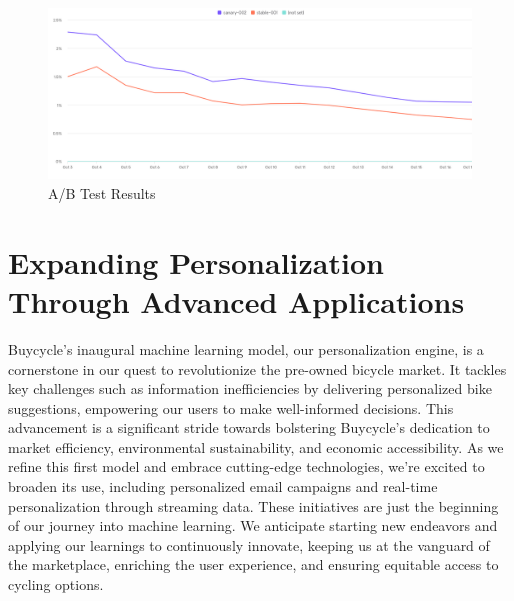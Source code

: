 \documentclass{article}
\begin{document}
\begin{figure}[h]
\centering
\includegraphics[width=1\textwidth]{ab_test_recom.png}
\caption{A/B Test Results}
\end{figure}



\section*{Expanding Personalization Through Advanced Applications}

Buycycle's inaugural machine learning model, our personalization engine, is a cornerstone in our quest to revolutionize the pre-owned bicycle market. It tackles key challenges such as information inefficiencies by delivering personalized bike suggestions, empowering our users to make well-informed decisions. This advancement is a significant stride towards bolstering Buycycle's dedication to market efficiency, environmental sustainability, and economic accessibility.
As we refine this first model and embrace cutting-edge technologies, we're excited to broaden its use, including personalized email campaigns and real-time personalization through streaming data. These initiatives are just the beginning of our journey into machine learning. We anticipate starting new endeavors and applying our learnings to continuously innovate, keeping us at the vanguard of the marketplace, enriching the user experience, and ensuring equitable access to cycling options.




\end{document}
